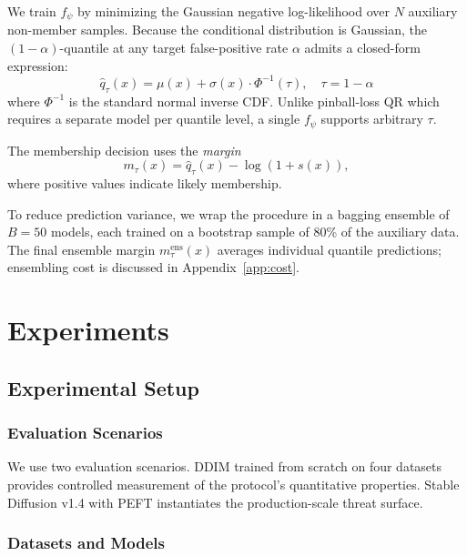 \documentclass{article}
\begin{document}
We train $f_\psi$ by minimizing the Gaussian negative log-likelihood 
over $N$ auxiliary non-member samples. Because the conditional distribution is Gaussian, the $(1{-}\alpha)$-quantile at any target false-positive rate $\alpha$ admits a closed-form expression:
\begin{equation}
\hat{q}_\tau(x) = \mu(x) + \sigma(x) \cdot \Phi^{-1}(\tau), \quad \tau = 1 - \alpha
\end{equation}
where $\Phi^{-1}$ is the standard normal inverse CDF. Unlike 
pinball-loss QR which requires a separate model per quantile 
level, a single $f_\psi$ supports arbitrary $\tau$.

The membership decision uses the \emph{margin}
\begin{equation}
m_\tau(x) = \hat{q}_\tau(x) - \log(1 + s(x)),
\end{equation}
where positive values indicate likely membership.

To reduce prediction variance, we wrap the procedure in a bagging 
ensemble of $B = 50$ models, each trained on a bootstrap sample 
of 80\% of the auxiliary data. The final ensemble margin 
$m_\tau^{\text{ens}}(x)$ averages individual quantile predictions; 
ensembling cost is discussed in Appendix~\ref{app:cost}.



\section{Experiments}
\label{sec:experiments}

\subsection{Experimental Setup}
\label{sec:setup}

\subsubsection{Evaluation Scenarios}
\label{sec:setup_scenarios}

We use two evaluation scenarios. DDIM trained from scratch on four datasets provides controlled measurement of the protocol's quantitative properties. Stable Diffusion v1.4 with PEFT instantiates the production-scale threat surface.

\subsubsection{Datasets and Models}
\label{sec:setup_datasets}
\end{document}
